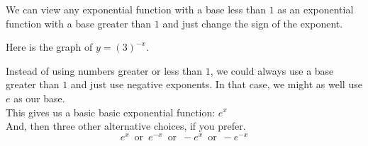 \documentclass{ximera}
\begin{document}
We can view any exponential function with a base less than $1$ as an exponential function with a base greater than $1$ and just change the sign of the exponent. \\








\begin{example}



Here is the graph of $y = \left( 3 \right)^{-x}$.

\begin{image}
\end{image}


\end{example}



Instead of using numbers greater or less than $1$, we could always use a base greater than $1$ and just use negative exponents.  In that case, we might as well use $e$ as our base. \\


This gives us a basic basic exponential function: $e^x$ \\



And, then three other alternative choices, if you prefer. \\


\[
e^x \, \text{ or } \, e^{-x} \, \text{ or } \, -e^{x} \, \text{ or } \, -e^{-x} 
\]
\end{document}

